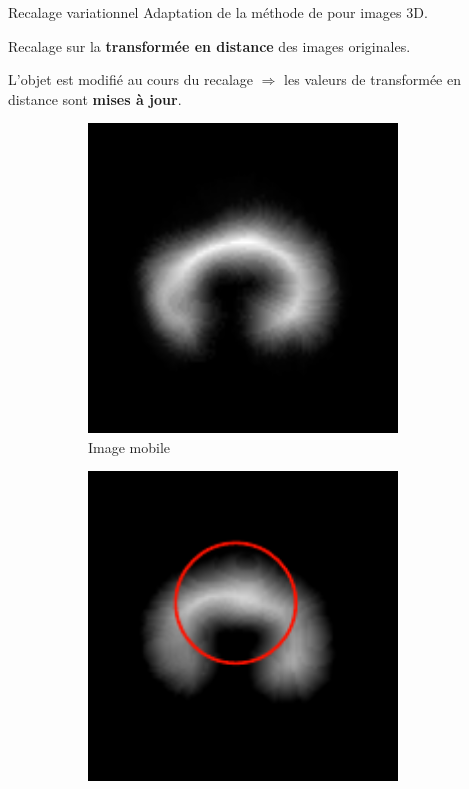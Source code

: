 \documentclass[10pt]{beamer}
\begin{document}
\begin{frame}{Recalage variationnel}
  Adaptation de la méthode de \cite{Modersitzki09} pour images 3D.

  Recalage sur la \textbf{transformée en distance} des images originales.

  L'objet est modifié au cours du recalage $\Rightarrow$ les valeurs de transformée en distance sont \textbf{mises à jour}.

  \begin{figure}[ht]
    \centering
    \begin{subfigure}[t]{0.33\textwidth}
      \centering
      \includegraphics[width=0.9\textwidth]{fig/variational_dt}
      \caption{Image mobile}
      \label{subfig:variational_dt}
    \end{subfigure}%
    \begin{subfigure}[t]{0.33\textwidth}
      \centering
      \includegraphics[width=0.9\textwidth]{fig/variational_dt3}

\end{subfigure}
\end{figure}
\end{frame}
\end{document}
